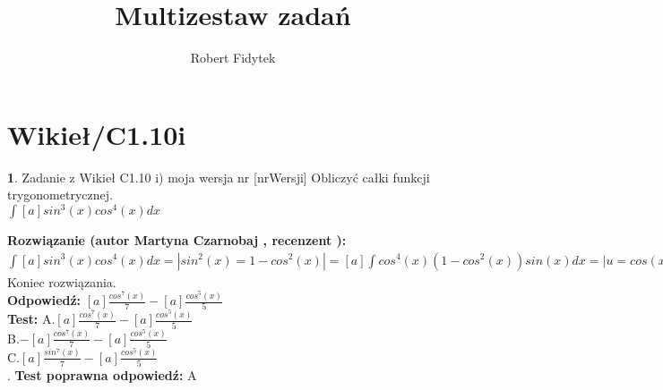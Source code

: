 \documentclass[12pt, a4paper]{article}
\title{Multizestaw zadań}
\author{Robert Fidytek}
\date{}
\theoremstyle{definition} %
\newtheorem{zad}{}
\newcommand{\kategoria}[1]{\section{#1}} %
\newcommand{\zadStart}[1]{\begin{zad}#1\newline} %
\newcommand{\zadStop}{\end{zad}}   %
\newcommand{\rozwStart}[2]{\noindent \textbf{Rozwiązanie (autor #1 , recenzent #2): }\newline} %
\newcommand{\rozwStop}{\newline}                                            %
\newcommand{\odpStart}{\noindent \textbf{Odpowiedź:}\newline}    %
\newcommand{\odpStop}{\newline}                                             %
\newcommand{\testStart}{\noindent \textbf{Test:}\newline} %
\newcommand{\testStop}{\newline} %
\newcommand{\kluczStart}{\noindent \textbf{Test poprawna odpowiedź:}\newline} %
\newcommand{\kluczStop}{\newline} %
\begin{document}
\maketitle


\kategoria{Wikieł/C1.10i}
\zadStart{Zadanie z Wikieł C1.10 i) moja wersja nr [nrWersji]}
Obliczyć całki funkcji trygonometrycznej.\\
$\int [a] sin^{3}(x) cos^{4}(x) dx$\\
\zadStop
\rozwStart{Martyna Czarnobaj}{}
	$\int [a] sin^{3}(x) cos^{4}(x) dx = |sin^{2}(x) = 1 - cos^{2}(x)| = [a] \int cos^{4}(x) (1 - cos^{2}(x)) sin(x) dx = |u=cos(x), du=-sin(x) dx| = [a] \int -u^{4} (1 - u^{2}) du = -[a] \int u^{4} - u^{6} du = -[a] ( - \int u^{6} du + \int u^{4} du) = -[a] (\frac{u^{7}}{7} + \frac{u^{5}}{5}) = [a]\frac{u^{7}}{7} - [a]\frac{u^{5}}{5} = [a]\frac{cos^{7}(x)}{7} - [a]\frac{cos^{5}(x)}{5}$\\ 


Koniec rozwiązania.\\
\rozwStop
\odpStart
$ [a]\frac{cos^{7}(x)}{7} - [a]\frac{cos^{5}(x)}{5}$\\
\odpStop
\testStart
A.$[a]\frac{cos^{7}(x)}{7} - [a]\frac{cos^{5}(x)}{5}$\\
B.$-[a]\frac{cos^{7}(x)}{7} - [a]\frac{cos^{5}(x)}{5}$\\
C.$[a]\frac{sin^{7}(x)}{7} - [a]\frac{cos^{5}(x)}{5}$\\
.
\testStop
\kluczStart
A
\kluczStop
\end{document}
